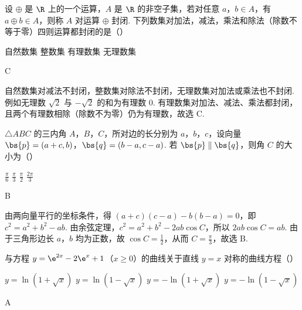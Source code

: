 \begin{problem}
设 \(\oplus\) 是 \(\R\) 上的一个运算，\(A\) 是 \(\R\) 的非空子集，若对任意 \(a\)，\(b\in A\)，有 \(a\oplus b\in A\)，则称 \(A\) 对运算 \(\oplus\) 封闭. 下列数集对加法，减法，乘法和除法（除数不等于零）四则运算都封闭的是（\quad）

\choices
    {自然数集}
    {整数集}
    {有理数集}
    {无理数集}
\end{problem}

\begin{answer}
C
\end{answer}

\begin{solution}
自然数集对减法不封闭，整数集对除法不封闭，无理数集对加法或乘法也不封闭. 例如无理数 \(\sqrt{2}\) 与 \(-\sqrt{2}\) 的和为有理数 \(0\). 有理数集对加法、减法、乘法都封闭，且两个有理数相除（除数不为零）仍为有理数，故选 C.
\end{solution}

\begin{problem}
\(\triangle ABC\) 的三内角 \(A\)，\(B\)，\(C\)，所对边的长分别为 \(a\)，\(b\)，\(c\)，设向量 \(\bs{p} = (a + c, b)\)，\(\bs{q} = (b - a, c - a)\). 若 \(\bs{p} \parallel \bs{q}\)，则角 \(C\) 的大小为（\quad）

\choices
    {\(\frac{\pi}{6}\)}
    {\(\frac{\pi}{3}\)}
    {\(\frac{\pi}{2}\)}
    {\(\frac{2\pi}{3}\)}
\end{problem}

\begin{answer}
B
\end{answer}

\begin{solution}
由两向量平行的坐标条件，得 \((a+c)(c-a)-b(b-a)=0\)，即 \(c^2=a^2+b^2-ab\). 由余弦定理，\(c^2=a^2+b^2-2ab\cos C\)，所以 \(2ab\cos C=ab\). 由于三角形边长 \(a\)，\(b\) 均为正数，故 \(\cos C=\frac12\)，从而 \(C=\frac{\pi}{3}\)，故选 B.
\end{solution}

\begin{problem}
与方程 \( y = \e^{2x} - 2\e^{x} + 1 \)（\(x \geqslant 0\)）的曲线关于直线 \( y = x \) 对称的曲线方程（\quad）

\choices
    {\( y = \ln (1 + \sqrt{x}) \)}
    {\( y = \ln (1 - \sqrt{x}) \)}
    {\( y = -\ln (1 + \sqrt{x}) \)}
    {\( y = -\ln (1 - \sqrt{x}) \)}
\end{problem}

\begin{answer}
A
\end{answer}

